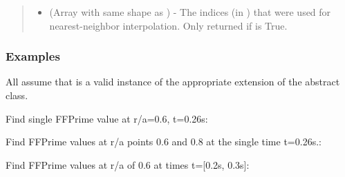 \documentclass[letterpaper,10pt,english]{sphinxmanual}
\begin{document}
\begin{fulllineitems}
\begin{fulllineitems}
\begin{quote}
\begin{description}
\begin{itemize}
\item {} 
 (Array with same shape as ) - The indices
(in ) that were used for
nearest-neighbor interpolation. Only returned if  is
True.

\end{itemize}


\end{description}\end{quote}
\subsubsection*{Examples}

All assume that  is a valid instance of the appropriate
extension of the {\hyperref[\detokenize{eqtools:eqtools.core.Equilibrium}]{}} abstract class.

Find single FFPrime value at r/a=0.6, t=0.26s:

\begin{sphinxVerbatim}[commandchars=\\\{\}]
   
\end{sphinxVerbatim}

Find FFPrime values at r/a points 0.6 and 0.8 at the
single time t=0.26s.:

\begin{sphinxVerbatim}[commandchars=\\\{\}]
  \PYG{p}{[} \PYG{p}{]} 
\end{sphinxVerbatim}

Find FFPrime values at r/a of 0.6 at times t={[}0.2s, 0.3s{]}:

\begin{sphinxVerbatim}[commandchars=\\\{\}]
   \PYG{p}{[} \PYG{p}{]}
\end{sphinxVerbatim}


\end{fulllineitems}
\end{fulllineitems}
\end{document}
